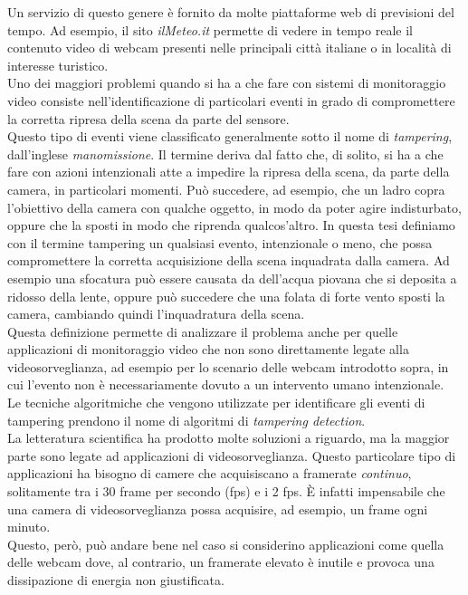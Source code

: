 Un servizio di questo genere \`e fornito da molte piattaforme web di previsioni del tempo.
Ad esempio, il sito \textit{ilMeteo.it} \cite{ilmeteo} permette di vedere in tempo reale il contenuto video di webcam presenti nelle principali citt\`a italiane o in localit\`a di interesse turistico.\\
Uno dei maggiori problemi quando si ha a che fare con sistemi di monitoraggio video consiste nell'identificazione di particolari eventi in grado di compromettere la corretta ripresa della scena da parte del sensore.\\
Questo tipo di eventi viene classificato generalmente sotto il nome di \textit{tampering}, dall'inglese \textit{manomissione}.
Il termine deriva dal fatto che, di solito, si ha a che fare con azioni intenzionali atte a impedire la ripresa della scena, da parte della camera, in particolari momenti.
Pu\`o succedere, ad esempio, che un ladro copra l'obiettivo della camera con qualche oggetto, in modo da poter agire indisturbato, oppure che la sposti in modo che riprenda qualcos'altro.
In questa tesi definiamo con il termine tampering un qualsiasi evento, intenzionale o meno, che possa compromettere la corretta acquisizione della scena inquadrata dalla camera.
Ad esempio una sfocatura pu\`o essere causata da dell'acqua piovana che si deposita a ridosso della lente, oppure pu\`o succedere che una folata di forte vento sposti la camera, cambiando quindi l'inquadratura della scena.\\
Questa definizione permette di analizzare il problema anche per quelle applicazioni di monitoraggio video che non sono direttamente legate alla videosorveglianza, ad esempio per lo scenario delle webcam introdotto sopra, in cui l'evento non \`e necessariamente dovuto a un intervento umano intenzionale.\\
Le tecniche algoritmiche che vengono utilizzate per identificare gli eventi di tampering prendono il nome di algoritmi di \textit{tampering detection}.\\
La letteratura scientifica ha prodotto molte soluzioni a riguardo, ma la maggior parte sono legate ad applicazioni di videosorveglianza.
Questo particolare tipo di applicazioni ha bisogno di camere che acquisiscano a framerate \textit{continuo}, solitamente tra i 30 frame per secondo (fps) e i 2 fps.
\`E infatti impensabile che una camera di videosorveglianza possa acquisire, ad esempio, un frame ogni minuto.\\
Questo, per\`o, pu\`o andare bene nel caso si considerino applicazioni come quella delle webcam dove, al contrario, un framerate elevato \`e inutile e provoca una dissipazione di energia non giustificata.\\


